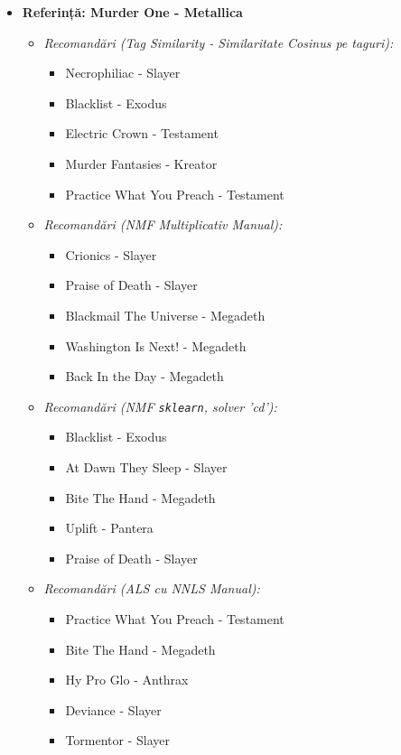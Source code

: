 \documentclass[12pt,a4paper]{article}
\begin{document}
	\begin{itemize}
		\item \textbf{Referință: Murder One - Metallica}
		\begin{itemize}
			\item \textit{Recomandări (Tag Similarity - Similaritate Cosinus pe taguri):}
			\begin{itemize}
				\item Necrophiliac - Slayer
				\item Blacklist - Exodus
				\item Electric Crown - Testament
				\item Murder Fantasies - Kreator
				\item Practice What You Preach - Testament
			\end{itemize}
			\vspace{0.5em} 
			\item \textit{Recomandări (NMF Multiplicativ Manual):}
			\begin{itemize}
				\item Crionics - Slayer
				\item Praise of Death - Slayer
				\item Blackmail The Universe - Megadeth
				\item Washington Is Next! - Megadeth
				\item Back In the Day - Megadeth
			\end{itemize}
			\vspace{0.5em}
			\item \textit{Recomandări (NMF \texttt{sklearn}, solver 'cd'):}
			\begin{itemize}
				\item Blacklist - Exodus
				\item At Dawn They Sleep - Slayer
				\item Bite The Hand - Megadeth
				\item Uplift - Pantera
				\item Praise of Death - Slayer
			\end{itemize}
			\vspace{0.5em}
			\item \textit{Recomandări (ALS cu NNLS Manual):}
			\begin{itemize}
				\item Practice What You Preach - Testament
				\item Bite The Hand - Megadeth
				\item Hy Pro Glo - Anthrax
				\item Deviance - Slayer
				\item Tormentor - Slayer
			\end{itemize}
		\end{itemize}
	\end{itemize}
	
\end{document}
